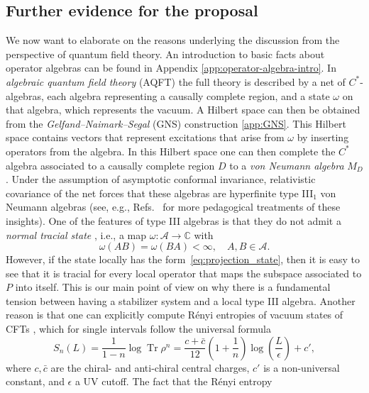 \documentclass[aps,pra,reprint,superscriptaddress]{revtex4-2}
\newcommand{\cA}{{\mathcal A}}
\newcommand\e{\epsilon}
\renewcommand\r{\rho}
\newcommand\w{\omega}
\providecommand{\Tr}{\operatorname{Tr}}
\theoremstyle{definition}
\theoremstyle{remark}
\begin{document}
\subsection{Further evidence for the proposal}
We now want to elaborate on the reasons underlying the discussion from the perspective of quantum field theory. An introduction to basic facts about operator algebras can be found in Appendix \ref{app:operator-algebra-intro}. In
\emph{algebraic quantum field theory} (AQFT) \cite{HaagKastler1964,Haag:1996hvx}
the full theory is described by a net of $C^\ast$-algebras, each algebra representing a causally complete region, and a state $\w$ on that algebra, which represents the vacuum.
A Hilbert space can then be obtained from the \emph{Gelfand–Naimark–Segal} (GNS) construction \ref{app:GNS}. This Hilbert space contains vectors that represent excitations that arise from $\w$ by inserting operators from the algebra. In this Hilbert space one can then complete the $C^\ast$ algebra associated to a causally complete region 
$D$ to a \emph{von Neumann algebra} $M_D$. Under the
assumption of asymptotic conformal invariance, relativistic covariance of the
net forces \cite{Buchholz:1986bg,Fredenhagen1985} that these algebras are hyperfinite type III$_1$ von Neumann algebras (see, e.g., Refs.~\cite{Haag:1996hvx, Witten:2018zxz, Sorce:2023fdx} for more pedagogical treatments of these insights).
One of the features of type III algebras is that they do not admit a \emph{normal tracial state} \cite{Sunder},
i.e., a map $\w:\cA \rightarrow \mathbb{C}$ with
\begin{equation}
    \w(AB) = \w(BA) < \infty,\quad A,B \in \cA.
\end{equation}
However, if the state locally has the form~\eqref{eq:projection_state}, then it
is easy to see that it is tracial for every local operator that maps the subspace associated to $P$ into itself. This is our main
point of view on why there is a fundamental tension between having a stabilizer
system and a local type III algebra. Another reason is 
that one can explicitly
compute R\'enyi entropies 
of vacuum states of CFTs \cite{Calabrese:2009qy}, which for single intervals follow the
universal formula 
\begin{equation}
    S_n(L) = \frac{1}{1-n} \log \Tr \r^{n} = \frac{c+\bar{c}}{12}(1 +
    \frac{1}{n})\log(\frac{L}{\e}) + c',
\end{equation}
where $c,\bar{c}$ are the chiral- and anti-chiral central charges, $c'$ is a non-universal constant, and $\e$ a UV cutoff. The fact that the R\'enyi entropy
\end{document}
